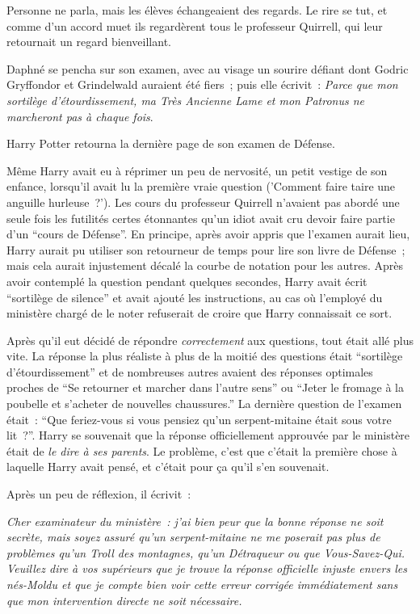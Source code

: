 Personne ne parla, mais les élèves échangeaient des regards. Le rire se tut, et comme d'un accord muet ils regardèrent tous le professeur Quirrell, qui leur retournait un regard bienveillant.

Daphné se pencha sur son examen, avec au visage un sourire défiant dont Godric Gryffondor et Grindelwald auraient été fiers~; puis elle écrivit~: \emph{Parce que mon sortilège d'étourdissement, ma Très Ancienne Lame et mon Patronus ne marcheront pas à chaque fois}.

\later

Harry Potter retourna la dernière page de son examen de Défense.

Même Harry avait eu à réprimer un peu de nervosité, un petit vestige de son enfance, lorsqu'il avait lu la première vraie question ('Comment faire taire une anguille hurleuse~?'). Les cours du professeur Quirrell n'avaient pas abordé une seule fois les futilités certes étonnantes qu'un idiot avait cru devoir faire partie d'un “cours de Défense”. En principe, après avoir appris que l'examen aurait lieu, Harry aurait pu utiliser son retourneur de temps pour lire son livre de Défense~; mais cela aurait injustement décalé la courbe de notation pour les autres. Après avoir contemplé la question pendant quelques secondes, Harry avait écrit “sortilège de silence” et avait ajouté les instructions, au cas où l'employé du ministère chargé de le noter refuserait de croire que Harry connaissait ce sort.

Après qu'il eut décidé de répondre \emph{correctement} aux questions, tout était allé plus vite. La réponse la plus réaliste à plus de la moitié des questions était “sortilège d'étourdissement” et de nombreuses autres avaient des réponses optimales proches de “Se retourner et marcher dans l'autre sens” ou “Jeter le fromage à la poubelle et s'acheter de nouvelles chaussures.”
La dernière question de l'examen était~: “Que feriez-vous si vous pensiez qu'un serpent-mitaine était sous votre lit~?”. Harry se souvenait que la réponse officiellement approuvée par le ministère était de \emph{le dire à ses parents}. Le problème, c'est que c'était la première chose à laquelle Harry avait pensé, et c'était pour ça qu'il s'en souvenait.

Après un peu de réflexion, il écrivit~:

\emph{Cher examinateur du ministère~: j'ai bien peur que la bonne réponse ne soit secrète, mais soyez assuré qu'un serpent-mitaine ne me poserait pas plus de problèmes qu'un Troll des montagnes, qu'un Détraqueur ou que Vous-Savez-Qui. Veuillez dire à vos supérieurs que je trouve la réponse officielle injuste envers les nés-Moldu et que je compte bien voir cette erreur corrigée immédiatement sans que mon intervention directe ne soit nécessaire.}

